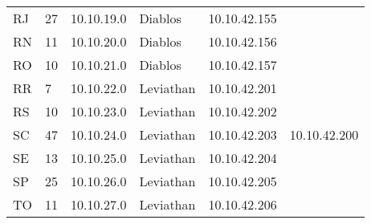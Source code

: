 \begin{table}[h]
\begin{tabular}{llllll}
        RJ &  27 &  10.10.19.0 &  Diablos & 10.10.42.155  & \\  
        RN &  11 &  10.10.20.0 &  Diablos & 10.10.42.156  & \\  
        RO &  10 &  10.10.21.0 &  Diablos & 10.10.42.157  & \\ \hline
        RR  & 7  &  10.10.22.0 &  Leviathan &   10.10.42.201 & \\
        RS &  10 &  10.10.23.0 &  Leviathan &   10.10.42.202  & \\  
        SC &  47 &  10.10.24.0 &  Leviathan &   10.10.42.203 & 10.10.42.200 \\   
        SE &  13 &  10.10.25.0 &  Leviathan &   10.10.42.204 & \\   
        SP &  25 &  10.10.26.0 &  Leviathan &   10.10.42.205  & \\  
        TO &  11 &  10.10.27.0 &  Leviathan &   10.10.42.206 & \\   
    \end{tabular}
\end{table}
